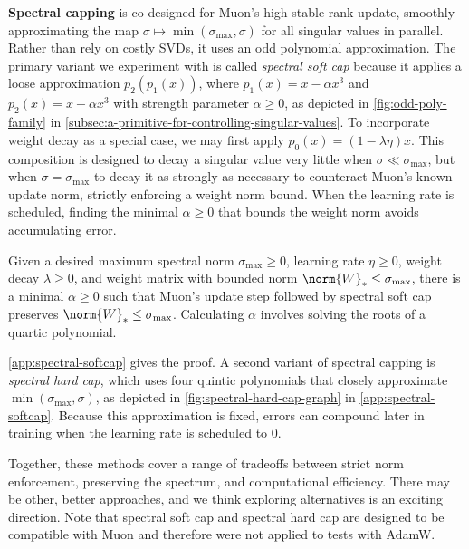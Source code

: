 \textbf{Spectral capping} is co-designed for Muon's high stable rank update, smoothly approximating the map $\sigma \mapsto \min(\sigma_\text{max}, \sigma)$ for all singular values in parallel. Rather than rely on costly SVDs, it uses an odd polynomial approximation. The primary variant we experiment with is called \textit{spectral soft cap} because it applies a loose approximation $p_2(p_1(x))$, where $p_1(x) = x - \alpha x^3$ and $p_2(x) = x + \alpha x^3$ with strength parameter $\alpha \geq 0$, as depicted in \cref{fig:odd-poly-family} in \cref{subsec:a-primitive-for-controlling-singular-values}. To incorporate weight decay as a special case, we may first apply $p_0(x) = (1 - \lambda \eta) x$. This composition is designed to decay a singular value very little when $\sigma \ll \sigma_\text{max}$, but when $\sigma = \sigma_\text{max}$ to decay it as strongly as necessary to counteract Muon's known update norm, strictly enforcing a weight norm bound. When the learning rate is scheduled, finding the minimal $\alpha \geq 0$ that bounds the weight norm avoids accumulating error.

\begin{theorembox}
    \label{thm:spectral-soft-cap-bound}
    Given a desired maximum spectral norm $\sigma_\text{max} \geq 0$, learning rate $\eta \geq 0$, weight decay $\lambda \geq 0$, and weight matrix with bounded norm $\norm{W}_\ast \leq \sigma_\text{max}$, there is a minimal $\alpha \geq 0$ such that Muon's update step followed by spectral soft cap preserves $\norm{W}_\ast \leq \sigma_\text{max}$. Calculating $\alpha$ involves solving the roots of a quartic polynomial.
\end{theorembox}

\cref{app:spectral-softcap} gives the proof. A second variant of spectral capping is \textit{spectral hard cap}, which uses four quintic polynomials that closely approximate $\min(\sigma_\text{max}, \sigma)$, as depicted in \cref{fig:spectral-hard-cap-graph} in \cref{app:spectral-softcap}. Because this approximation is fixed, errors can compound later in training when the learning rate is scheduled to $0$.

Together, these methods cover a range of tradeoffs between strict norm enforcement, preserving the spectrum, and computational efficiency. There may be other, better approaches, and we think exploring alternatives is an exciting direction. Note that spectral soft cap and spectral hard cap are designed to be compatible with Muon and therefore were not applied to tests with AdamW.

